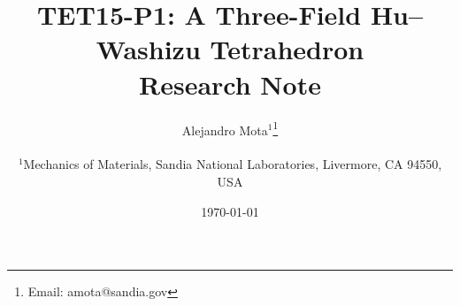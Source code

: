 \documentclass{article}
\theoremstyle{definition}
\theoremstyle{plain}
\begin{document}
\pagestyle{fancyplain}



\title{TET15-P1: A Three-Field Hu--Washizu Tetrahedron\\[0.3em]
  \large Research Note}

\author{\large Alejandro Mota$^1$\thanks{Email: amota@sandia.gov}
  \\
  \\
  {\footnotesize $^1$Mechanics of Materials, Sandia National Laboratories, Livermore, CA 94550, USA}
}

\date{\today}

\maketitle
\end{document}
